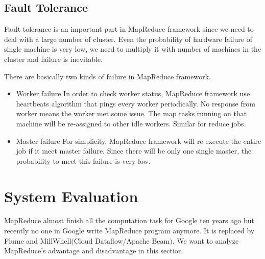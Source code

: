 \documentclass{article}
\begin{document}
\subsection{Fault Tolerance}

Fault tolerance is an important part in MapReduce framework since we need to deal with a large number of cluster. 
Even the probability of hardware failure 
of single machine is very low, we need to multiply it with number of machines in the cluster and failure is inevitable.

There are basically two kinds of failure in MapReduce framework.
\begin{itemize}
      \item Worker failure
      In order to check worker status, MapReduce framework use heartbeats algorithm that pings every worker periodically. No response from worker means the 
      worker met some issue. The map tasks running on that machine will be re-assigned to other idle workers. Similar for reduce jobs. 
      \item Master failure
      For simplicity, MapReduce framework will re-execute the entire job if it meet master failure. Since there will be only one single master,
      the probability to meet this failure is very low.
\end{itemize}

\section{System Evaluation}
MapReduce almost finish all the computation task for 
Google ten years ago but recently no one in Google write MapReduce program anymore.
 It is replaced by Flume and MillWhell$($Cloud Dataflow/Apache Beam$)$. We want to analyze MapReduce's advantage and disadvantage in this section.
\end{document}
